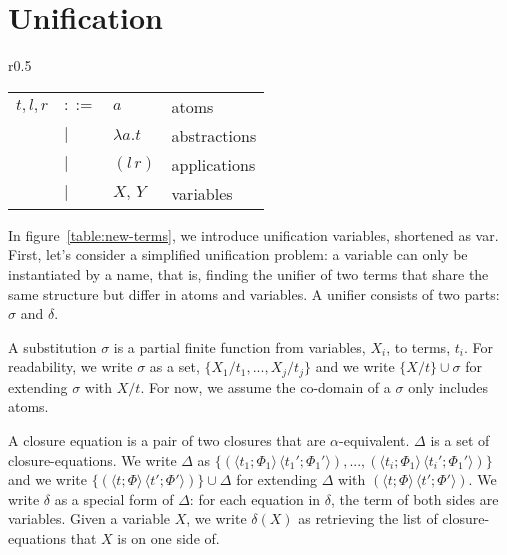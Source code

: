 \documentclass[a4paper,UKenglish]{lipics-v2016}
\newcommand{\clos}[2] {
  \langle #1; #2 \rangle
}
\newcommand{\app}[2] {
  (#1\, #2)
}
\newcommand{\pr}[2] {
 (#1\, #2)
}
\newcommand{\bd}[2] {
 #1/ #2
}
\begin{document}
\section{Unification}
\label{unify}
\begin{wrapfigure}{r}{0.5\textwidth}
  \caption{Unification terms\label{table:new-terms}}
    \begin{tabular}{r l l l}  
    $t,l,r$ & $::=$ & $a$ & atoms \\
    & $|$ & $\lambda a.t$ & abstractions \\
    & $|$ & $\app{l}{r}$ & applications \\
    & $|$ & $X,\,Y$ & variables \\
    \end{tabular}
\end{wrapfigure}
In figure~\ref{table:new-terms}, we introduce unification variables, shortened as var.
First, let's consider a simplified unification problem:
a variable can only be instantiated by a name,
that is, finding the unifier of two terms
that share the same structure but differ in atoms and variables.
A unifier consists of two parts: $\sigma$ and $\delta$.
\begin{definition}
  A substitution $\sigma$ is a partial finite function from variables, $X_i$, to terms, $t_i$.
  For readability, we write $\sigma$ as a set, $\{\bd{X_1}{t_1}, ..., \bd{X_j}{t_j}\}$
  and we write $\{\bd{X}{t}\} \cup \sigma$ for extending $\sigma$ with $\bd{X}{t}$.
  For now, we assume the co-domain of a $\sigma$ only includes atoms.
\end{definition}

\begin{definition}
  A closure equation is a pair of two closures that are $\alpha$-equivalent.
  $\Delta$ is a set of closure-equations.
  We write $\Delta$ as $\{\pr{\clos{t_1}{\Phi_1}}{\clos{t_1'}{\Phi_1'}}, ..., \pr{\clos{t_i}{\Phi_1}}{\clos{t_i'}{\Phi_1'}}\}$ and
  we write $\{\pr{\clos{t}{\Phi}}{\clos{t'}{\Phi'}}\}\cup\Delta$ for extending $\Delta$ with $\pr{\clos{t}{\Phi}}{\clos{t'}{\Phi'}}$.
  We write $\delta$ as a special form of $\Delta$: for each equation in $\delta$, the term of both sides are variables.
  Given a variable $X$, we write $\delta(X)$ as retrieving the list of closure-equations that $X$ is on one side of.
\end{definition}
\end{document}
